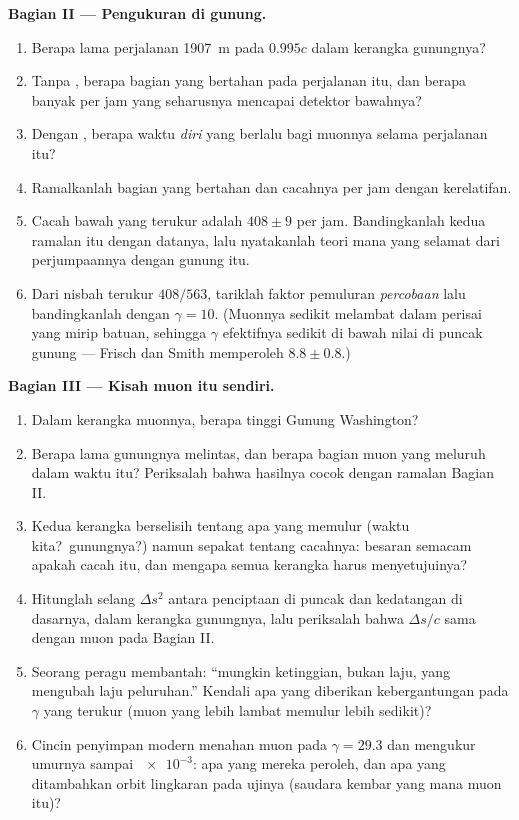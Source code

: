 \begin{problem}
\medskip\noindent\textbf{Bagian II --- Pengukuran di gunung.}
\begin{enumerate}[resume]
  \item Berapa lama perjalanan \qty{1907}{m} pada $0.995c$ dalam
        kerangka gunungnya?
  \item Tanpa , berapa bagian yang bertahan pada
        perjalanan itu, dan berapa banyak per jam yang seharusnya
        mencapai detektor bawahnya?
  \item Dengan , berapa waktu \emph{diri} yang berlalu
        bagi muonnya selama perjalanan itu?
  \item Ramalkanlah bagian yang bertahan dan cacahnya per jam dengan
        kerelatifan.
  \item Cacah bawah yang terukur adalah $408 \pm 9$ per jam.
        Bandingkanlah kedua ramalan itu dengan datanya, lalu
        nyatakanlah teori mana yang selamat dari perjumpaannya dengan
        gunung itu.
  \item Dari nisbah terukur $408/563$, tariklah faktor pemuluran
        \emph{percobaan} lalu bandingkanlah dengan
        $\gamma = 10$. (Muonnya sedikit melambat dalam perisai yang
        mirip batuan, sehingga $\gamma$ efektifnya sedikit di bawah
        nilai di puncak gunung --- Frisch dan Smith memperoleh $8.8 \pm
        0.8$.)
\end{enumerate}

\medskip\noindent\textbf{Bagian III --- Kisah muon itu sendiri.}
\begin{enumerate}[resume]
  \item Dalam kerangka muonnya, berapa tinggi Gunung Washington?
  \item Berapa lama gunungnya melintas, dan berapa bagian muon yang
        meluruh dalam waktu itu? Periksalah bahwa hasilnya cocok dengan
        ramalan Bagian II.
  \item Kedua kerangka berselisih tentang apa yang memulur (waktu
        kita?\ gunungnya?) namun sepakat tentang cacahnya: besaran
        semacam apakah cacah itu, dan mengapa semua kerangka harus
        menyetujuinya?
  \item Hitunglah selang $\Delta s^2$ antara penciptaan di puncak dan
        kedatangan di dasarnya, dalam kerangka gunungnya, lalu
        periksalah bahwa $\Delta s/c$ sama dengan  muon pada
        Bagian II.
  \item Seorang peragu membantah: ``mungkin ketinggian, bukan laju,
        yang mengubah laju peluruhan.'' Kendali apa yang diberikan
        kebergantungan pada $\gamma$ yang terukur (muon yang lebih
        lambat memulur lebih sedikit)?
  \item Cincin penyimpan modern menahan muon pada $\gamma = 29.3$ dan
        mengukur umurnya sampai $\num{e-3}$: apa yang mereka peroleh,
        dan apa yang ditambahkan orbit lingkaran pada ujinya (saudara
        kembar yang mana muon itu)?
\end{enumerate}


\end{problem}
